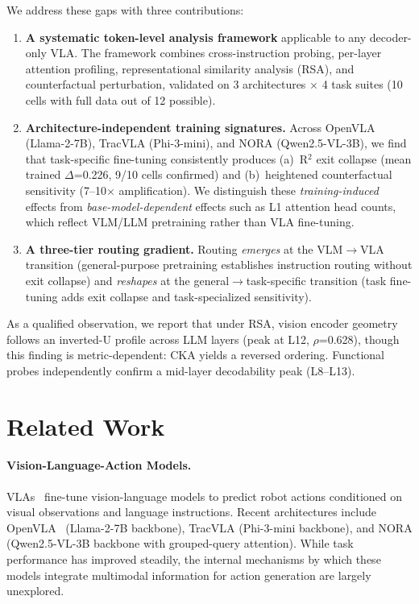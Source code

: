 \documentclass[letterpaper]{article}
\begin{document}
We address these gaps with three contributions:

\begin{enumerate}
  \item \textbf{A systematic token-level analysis framework} applicable to any decoder-only VLA.
        The framework combines cross-instruction probing, per-layer attention profiling, representational similarity analysis (RSA), and counterfactual perturbation, validated on 3 architectures $\times$ 4 task suites (10 cells with full data out of 12 possible).

  \item \textbf{Architecture-independent training signatures.}
        Across OpenVLA (Llama-2-7B), TracVLA (Phi-3-mini), and NORA (Qwen2.5-VL-3B), we find that task-specific fine-tuning consistently produces (a)~R$^2$ exit collapse (mean trained $\Delta$=0.226, 9/10 cells confirmed) and (b)~heightened counterfactual sensitivity (7--10$\times$ amplification).
        We distinguish these \emph{training-induced} effects from \emph{base-model-dependent} effects such as L1 attention head counts, which reflect VLM/LLM pretraining rather than VLA fine-tuning.

  \item \textbf{A three-tier routing gradient.}
        Routing \emph{emerges} at the VLM$\to$VLA transition (general-purpose pretraining establishes instruction routing without exit collapse) and \emph{reshapes} at the general$\to$task-specific transition (task fine-tuning adds exit collapse and task-specialized sensitivity).
\end{enumerate}

As a qualified observation, we report that under RSA, vision encoder geometry follows an inverted-U profile across LLM layers (peak at L12, $\rho$=0.628), though this finding is metric-dependent: CKA yields a reversed ordering.
Functional probes independently confirm a mid-layer decodability peak (L8--L13).

\section{Related Work}
\label{sec:related}

\paragraph{Vision-Language-Action Models.}
VLAs~\cite{brohan2023rt2, kim2024openvla} fine-tune vision-language models to predict robot actions conditioned on visual observations and language instructions.
Recent architectures include OpenVLA~\cite{kim2024openvla} (Llama-2-7B backbone), TracVLA (Phi-3-mini backbone), and NORA (Qwen2.5-VL-3B backbone with grouped-query attention).
While task performance has improved steadily, the internal mechanisms by which these models integrate multimodal information for action generation are largely unexplored.
\end{document}
